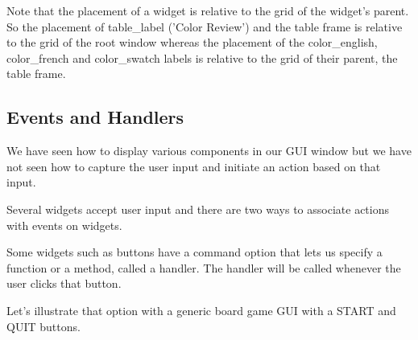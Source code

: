 \documentclass{article}
\begin{document}
Note that the placement of a widget is relative to the grid of the widget's parent.  So the placement of  table{\_}label ('Color Review') and the table frame is relative to the grid of the root window whereas the placement of the color{\_}english, color{\_}french and color{\_}swatch labels is relative to the grid of their parent, the table frame.

\subsection{Events and Handlers}
We have seen how to display various components in our GUI window but we have not seen how to capture the user input and initiate an action based on that input.

Several widgets accept user input and there are two ways to associate actions with events on widgets.

Some widgets such as buttons have a command option that lets us specify a function or a method, called a handler.  The handler will be called whenever the user clicks that button.  

Let's illustrate that option with a generic board game GUI with a START and QUIT buttons.  
\end{document}
